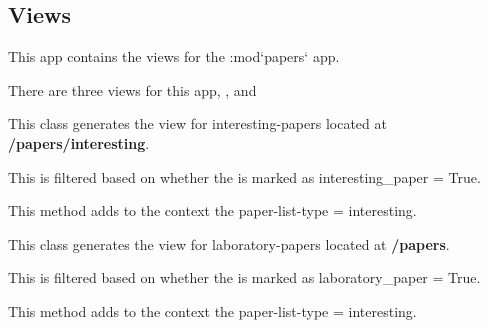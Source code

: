 \documentclass[letterpaper,10pt,english]{sphinxmanual}
\begin{document}
\subsection{Views}
\label{papers:module-papers.views}\label{papers:views}
This app contains the views for the :mod{}`papers{}` app.

There are three views for this app, {\hyperref[papers:papers.views.LaboratoryPaperList]{}}, {\hyperref[papers:papers.views.InterestingPaperList]{}} and {\hyperref[papers:papers.views.PaperDetailView]{}}

\begin{fulllineitems}
\label{papers:papers.views.InterestingPaperList}
This class generates the view for interesting-papers located at \textbf{/papers/interesting}.

This is filtered based on whether the {\hyperref[papers:papers.models.Publication]{}} is marked as interesting\_paper = True.

\begin{fulllineitems}
\label{papers:papers.views.InterestingPaperList.get_context_data}
This method adds to the context the paper-list-type  = interesting.

\end{fulllineitems}


\end{fulllineitems}


\begin{fulllineitems}
\label{papers:papers.views.LaboratoryPaperList}
This class generates the view for laboratory-papers located at \textbf{/papers}.

This is filtered based on whether the {\hyperref[papers:papers.models.Publication]{}} is marked as laboratory\_paper = True.

\begin{fulllineitems}
\label{papers:papers.views.LaboratoryPaperList.get_context_data}
This method adds to the context the paper-list-type  = interesting.

\end{fulllineitems}


\end{fulllineitems}
\end{document}
